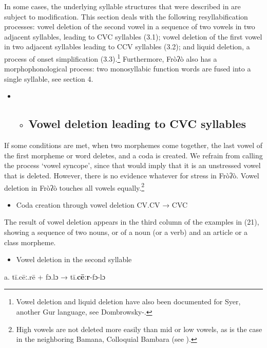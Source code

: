 In some cases, the underlying syllable structures that were described in  are subject to modification. This section deals with the following resyllabification processes: vowel deletion of the second vowel in a sequence of two vowels in two adjacent syllables, leading to CVC syllables (3.1); vowel deletion of the first vowel in two adjacent syllables leading to CCV syllables (3.2); and liquid deletion, a process of onset simplification (3.3).\footnote{Vowel deletion and liquid deletion have also been documented for Syer, another Gur language, see Dombrowsky-\citet{Hahn2015}.} Furthermore, Fròʔò also has a morphophonological process: two monosyllabic function words are fused into a single syllable, see section 4. 

\begin{itemize}
\item \begin{itemize}
\item \subsection{ Vowel deletion leading to CVC syllables} \end{itemize}
\end{itemize}

If some conditions are met, when two morphemes come together, the last vowel of the first morpheme or word deletes, and a coda is created. We refrain from calling the process ‘vowel syncope’, since that would imply that it is an unstressed vowel that is deleted. However, there is no evidence whatever for stress in Fròʔò. Vowel deletion in Fròʔò touches all vowels equally.\footnote{{}  High vowels are not deleted more easily than mid or low vowels, as is the case in the neighboring Bamana, Colloquial Bambara (see \citealt{GreenEtAl2014}).}

\begin{itemize}
\item \begin{styleindexi}
 Coda creation through vowel deletion CV.CV → CVC
\end{styleindexi}\end{itemize}

The result of vowel deletion appears in the third column of the examples in (21), showing a sequence of two nouns, or of a noun (or a verb) and an article or a class morpheme. 

\begin{itemize}
\item \begin{styleindexi}
   \label{bkm:Ref499278845}Vowel deletion in the second syllable  
\end{styleindexi}\end{itemize}
\begin{styleindexi}
      a.  tī.cēː.rē               +     fɔ.lɔ                       →                  tī.\textbf{cēːr}{}-fɔ-lɔ 
\end{styleindexi}

